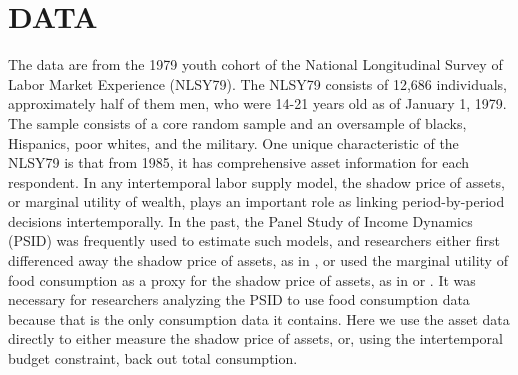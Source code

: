 \documentclass{article}
\begin{document}
\section{DATA}
\label{section:data}
The data are from the 1979 youth cohort of the National Longitudinal Survey of Labor Market Experience (NLSY79). The NLSY79 consists of 12,686 individuals, approximately half of them men, who were 14-21 years old as of January 1, 1979. The sample consists of a core random sample and an oversample of blacks, Hispanics, poor whites, and the military. One unique characteristic of the NLSY79 is that from 1985, it has comprehensive asset information for each respondent. In any intertemporal labor supply model, the shadow price of assets, or marginal utility of wealth, plays an important role as linking period-by-period decisions intertemporally. In the past, the Panel Study of Income Dynamics (PSID) was frequently used to estimate such models, and researchers either first differenced away the shadow price of assets, as in \cite{MaCurdy1981-iy}, or used the marginal utility of food consumption as a proxy for the shadow price of assets, as in  \cite{Altonji1986-zf} or \cite{Shaw1989-jb}. It was necessary for researchers analyzing the PSID to use food consumption data because that is the only consumption data it contains. Here we use the asset data directly to either measure the shadow price of assets, or, using the intertemporal budget constraint, back out total consumption. \par
\end{document}
